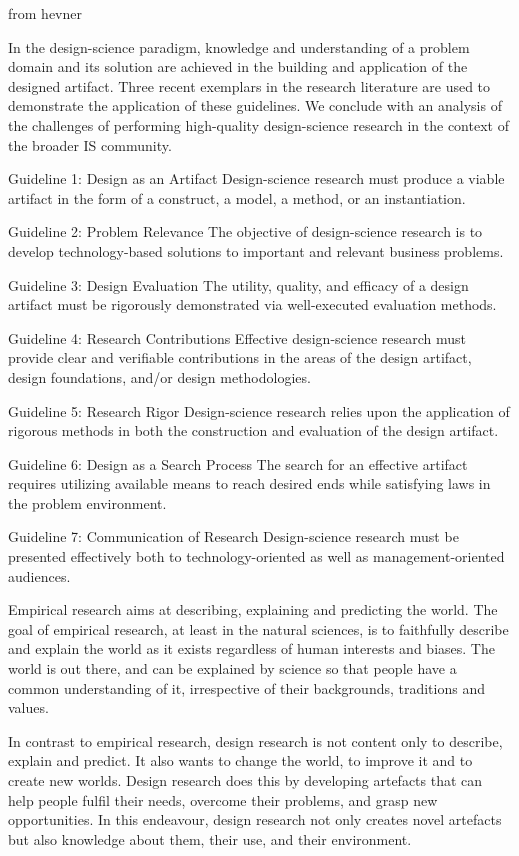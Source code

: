 

from hevner {
In the design-science
paradigm, knowledge and understanding of a
problem domain and its solution are achieved in
the building and application of the designed artifact.
Three recent exemplars in the research
literature are used to demonstrate the application
of these guidelines. We conclude with an analysis
of the challenges of performing high-quality
design-science research in the context of the
broader IS community.

Guideline 1: Design as an Artifact 
Design-science research must produce a viable artifact in the
form of a construct, a model, a method, or an instantiation.

Guideline 2: Problem Relevance 
The objective of design-science research is to develop
technology-based solutions to important and relevant
business problems.

Guideline 3: Design Evaluation 
The utility, quality, and efficacy of a design artifact must be
rigorously demonstrated via well-executed evaluation
methods.

Guideline 4: Research Contributions
Effective design-science research must provide clear and
verifiable contributions in the areas of the design artifact,
design foundations, and/or design methodologies.

Guideline 5: Research Rigor 
Design-science research relies upon the application of
rigorous methods in both the construction and evaluation of
the design artifact.

Guideline 6: Design as a Search Process
The search for an effective artifact requires utilizing available
means to reach desired ends while satisfying laws in the
problem environment.

Guideline 7: Communication of Research
Design-science research must be presented effectively both
to technology-oriented as well as management-oriented
audiences.
}

Empirical research aims at describing, explaining and predicting the
world. The goal of empirical research, at least in the natural sciences, is to faithfully
describe and explain the world as it exists regardless of human
interests and biases. The world is out there, and can be explained by
science so that people have a common understanding of it, irrespective
of their backgrounds, traditions and values.

In contrast to empirical research, design research is not content
only to describe, explain and predict. It also wants to change the
world, to improve it and to create new worlds. Design research does
this by developing artefacts that can help people fulfil their needs,
overcome their problems, and grasp new opportunities. In this endeavour,
design research not only creates novel artefacts but also
knowledge about them, their use, and their environment.


